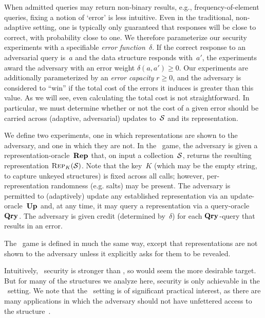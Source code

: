 When admitted queries may return non-binary results, e.g.,
frequency-of-element queries, fixing a notion of `error' is less
intuitive.  Even in the traditional, non-adaptive setting, one is
typically only guaranteed that responses will be close to correct,
with probability close to one. 
We therefore parameterize our security experiments with a specifiable
\emph{error function}~$\delta$.  If the correct response to an adversarial
query is~$a$ and the data structure responds with~$a'$, the
experiments award the adversary with an error weight $\delta(a,a') \geq 0$.
%
Our experiments are additionally parameterized by an \emph{error capacity}
$r\geq0$, and the adversary is considered to ``win'' if the total cost of the
errors it induces is greater than this value.  As we will see, even calculating
the total cost is not straightforward.  In particular, we must determine whether
or not the cost of a given error should be carried across (adaptive,
adversarial) updates to~$\mathcal{S}$ and its representation.

We define two experiments, one in which representations are shown to
the adversary, and one in which they are not.
%
In the \errep\ game, the adversary is given a
representation-oracle~$\textup{\textbf{Rep}}\hspace{0.5pt}$ that, on input a collection~$\mathcal{S}$,
returns the resulting representation $\textnormal{\textsc{Rep}}_K(\mathcal{S})$. Note that the
key~$K$ (which may be the empty string, to capture unkeyed structures)
is fixed across all calls; however, per-representation randomness
(e.g. salts) may be present.  The adversary is permitted to
(adaptively) update any established representation via an
update-oracle~$\textup{\textbf{Up}}\hspace{0.5pt}$ and, at any time, it may query a representation
via a query-oracle~$\textup{\textbf{Qry}}\hspace{0.5pt}$. The adversary is given credit (determined
by~$\delta$) for each $\textup{\textbf{Qry}}\hspace{0.5pt}$-query that results in an error.

The \erreps\ game is defined in much the same way, except that representations
are not shown to the adversary unless it explicitly asks for them to be
revealed.

Intuitively, \errep\
security is stronger than \erreps, so would seem the more desirable
target.  But for many of the structures we analyze here, security is only achievable in
the \erreps\ setting.
%
We note that the \erreps\ setting is of significant practical interest, as there are many
applications in which the adversary should not have unfettered access to the
structure~\cite{gerbet2015power}.

